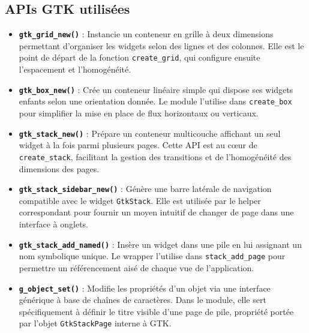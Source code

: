 \subsection{APIs GTK utilisées}

\begin{itemize}
    \item \textbf{\texttt{gtk\_grid\_new()}} : Instancie un conteneur en grille à deux dimensions permettant d'organiser les widgets selon des lignes et des colonnes. Elle est le point de départ de la fonction \texttt{create\_grid}, qui configure ensuite l'espacement et l'homogénéité.
    \item \textbf{\texttt{gtk\_box\_new()}} : Crée un conteneur linéaire simple qui dispose ses widgets enfants selon une orientation donnée. Le module l'utilise dans \texttt{create\_box} pour simplifier la mise en place de flux horizontaux ou verticaux.
    \item \textbf{\texttt{gtk\_stack\_new()}} : Prépare un conteneur multicouche affichant un seul widget à la fois parmi plusieurs pages. Cette API est au cœur de \texttt{create\_stack}, facilitant la gestion des transitions et de l'homogénéité des dimensions des pages.
    \item \textbf{\texttt{gtk\_stack\_sidebar\_new()}} : Génère une barre latérale de navigation compatible avec le widget \texttt{GtkStack}. Elle est utilisée par le helper correspondant pour fournir un moyen intuitif de changer de page dans une interface à onglets.
    \item \textbf{\texttt{gtk\_stack\_add\_named()}} : Insère un widget dans une pile en lui assignant un nom symbolique unique. Le wrapper l'utilise dans \texttt{stack\_add\_page} pour permettre un référencement aisé de chaque vue de l'application.
    \item \textbf{\texttt{g\_object\_set()}} : Modifie les propriétés d'un objet via une interface générique à base de chaînes de caractères. Dans le module, elle sert spécifiquement à définir le titre visible d'une page de pile, propriété portée par l'objet \texttt{GtkStackPage} interne à GTK.
\end{itemize}

\newpage
